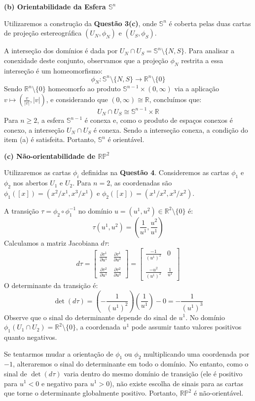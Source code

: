 {	\textbf{(b) Orientabilidade da Esfera $\mathbb{S}^n$}
	
	Utilizaremos a construção da \textbf{Questão 3(c)}, onde $\mathbb{S}^n$ é coberta pelas duas cartas de projeção estereográfica $(U_N, \phi_N)$ e $(U_S, \phi_S)$. 
	
	A interseção dos domínios é dada por $U_N \cap U_S = \mathbb{S}^n \setminus \{N, S\}$. Para analisar a conexidade deste conjunto, observamos que a projeção $\phi_N$ restrita a essa interseção é um homeomorfismo:
	\[ \phi_N : \mathbb{S}^n \setminus \{N, S\} \longrightarrow \mathbb{R}^n \setminus \{0\} \]
	Sendo $\mathbb{R}^n \setminus \{0\}$ homeomorfo ao produto $\mathbb{S}^{n-1} \times (0, \infty)$ via a aplicação $v \mapsto \left( \frac{v}{|v|}, |v| \right)$, e considerando que $(0, \infty) \cong \mathbb{R}$, concluímos que:
	\[ U_N \cap U_S \cong \mathbb{S}^{n-1} \times \mathbb{R} \]
	Para $n \ge 2$, a esfera $\mathbb{S}^{n-1}$ é conexa e, como o produto de espaços conexos é conexo, a interseção $U_N \cap U_S$ é conexa. Sendo a interseção conexa, a condição do item (a) é satisfeita. Portanto, $\mathbb{S}^n$ é orientável.
	
	\textbf{(c) Não-orientabilidade de $\mathbb{RP}^2$}
	
	Utilizaremos as cartas $\phi_i$ definidas na \textbf{Questão 4}. Consideremos as cartas $\phi_1$ e $\phi_2$ nos abertos $U_1$ e $U_2$. Para $n=2$, as coordenadas são $\phi_1([x]) = (x^2/x^1, x^3/x^1)$ e $\phi_2([x]) = (x^1/x^2, x^3/x^2)$.
	
	A transição $\tau = \phi_2 \circ \phi_1^{-1}$ no domínio $u = (u^1, u^2) \in \mathbb{R}^2 \setminus \{0\}$ é:
	\[ \tau(u^1, u^2) = \left( \frac{1}{u^1}, \frac{u^2}{u^1} \right) \]
	Calculamos a matriz Jacobiana $d\tau$:
	\[ d\tau = \begin{bmatrix} 
		\frac{\partial \tau^1}{\partial u^1} & \frac{\partial \tau^1}{\partial u^2} \\ 
		\\
		\frac{\partial \tau^2}{\partial u^1} & \frac{\partial \tau^2}{\partial u^2} \end{bmatrix} = \begin{bmatrix} 
		\frac{-1}{(u^1)^2} & 0 \\
		\\
		\frac{-u^2}{(u^1)^2} & \frac{1}{u^1} \end{bmatrix} \]
	O determinante da transição é:
	\[ \det(d\tau) = \left( -\frac{1}{(u^1)^2} \right) \left( \frac{1}{u^1} \right) - 0 = -\frac{1}{(u^1)^3} \]
	Observe que o sinal do determinante depende do sinal de $u^1$. No domínio $\phi_1(U_1 \cap U_2) = \mathbb{R}^2 \setminus \{0\}$, a coordenada $u^1$ pode assumir tanto valores positivos quanto negativos. 
	
	Se tentarmos mudar a orientação de $\phi_1$ ou $\phi_2$ multiplicando uma coordenada por $-1$, alteraremos o sinal do determinante em todo o domínio. No entanto, como o sinal de $\det(d\tau)$ varia dentro do mesmo domínio de transição (ele é positivo para $u^1 < 0$ e negativo para $u^1 > 0$), não existe escolha de sinais para as cartas que torne o determinante globalmente positivo. Portanto, $\mathbb{RP}^2$ é não-orientável.
}
